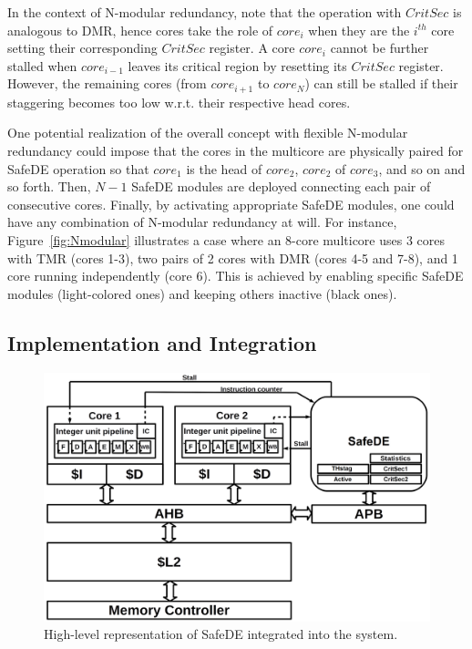 In the context of N-modular redundancy, note that the operation with $CritSec$ is analogous to DMR, hence cores take the role of $core_i$ when they are the $i^{th}$ core setting their corresponding $CritSec$ register. A core $core_i$ cannot be further stalled when $core_{i-1}$ leaves its critical region by resetting its $CritSec$ register. However, the remaining cores (from $core_{i+1}$ to $core_{N}$) can still be stalled if their staggering becomes too low w.r.t. their respective head cores.

One potential realization of the overall concept with flexible N-modular redundancy could impose that the cores in the multicore are physically paired for SafeDE operation so that $core_1$ is the head of $core_2$, $core_2$ of $core_3$, and so on and so forth. Then, $N-1$ SafeDE modules are deployed connecting each pair of consecutive cores. Finally, by activating appropriate SafeDE modules, one could have any combination of N-modular redundancy at will. For instance, Figure~\ref{fig:Nmodular} illustrates a case where an 8-core multicore uses 3 cores with TMR (cores 1-3), two pairs of 2 cores with DMR (cores 4-5 and 7-8), and 1 core running independently (core 6). This is achieved by enabling specific SafeDE modules (light-colored ones) and keeping others inactive (black ones).



\subsection{Implementation and Integration}
\label{sec:integ}

\begin{figure}[t!]
\centering
  \includegraphics[width=1\columnwidth]{imgs/system.png} 
  \caption{High-level representation of SafeDE integrated into the system.}
  \label{fig:system}
\end{figure}

